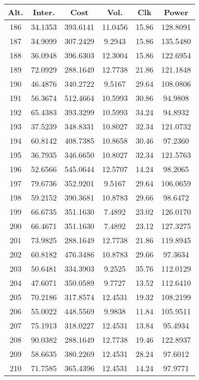 \begin{center}
\begin{footnotesize}
\begin{tabular}{|c|ccccc|}
\hline
Alt. & Inter. & Cost & Vol. & Clk & Power\\
\hline
186 & 34.1353 & 393.6141 & 11.0456 & 15.86 & 128.8091 \\
187 & 34.9099 & 307.2429 & 9.2943 & 15.86 & 135.5480 \\
188 & 36.0948 & 396.6303 & 12.3004 & 15.86 & 122.6954 \\
189 & 72.0929 & 288.1649 & 12.7738 & 21.86 & 121.1848 \\
190 & 46.4876 & 340.2722 & 9.5167 & 29.64 & 108.0806 \\
191 & 56.3674 & 512.4664 & 10.5993 & 30.86 & 94.9808 \\
192 & 65.4383 & 393.3299 & 10.5993 & 34.24 & 94.8932 \\
193 & 37.5239 & 348.8331 & 10.8027 & 32.34 & 121.0732 \\
194 & 60.8142 & 408.7385 & 10.8658 & 30.46 & 97.2360 \\
195 & 36.7935 & 346.6650 & 10.8027 & 32.34 & 121.5763 \\
196 & 52.6566 & 545.0644 & 12.5707 & 14.24 & 98.2065 \\
197 & 79.6736 & 352.9201 & 9.5167 & 29.64 & 106.0659 \\
198 & 59.2152 & 390.3681 & 10.8783 & 29.66 & 98.6472 \\
199 & 66.6735 & 351.1630 & 7.4892 & 23.02 & 126.0170 \\
200 & 66.4671 & 351.1630 & 7.4892 & 23.12 & 127.3275 \\
201 & 73.9825 & 288.1649 & 12.7738 & 21.86 & 119.8945 \\
202 & 60.8182 & 476.3486 & 10.8783 & 29.66 & 97.3634 \\
203 & 50.6481 & 334.3903 & 9.2525 & 35.76 & 112.0129 \\
204 & 47.6071 & 350.0589 & 9.7727 & 13.52 & 112.6410 \\
205 & 70.2186 & 317.8574 & 12.4531 & 19.32 & 108.2199 \\
206 & 55.0022 & 448.5569 & 9.9838 & 11.84 & 105.9511 \\
207 & 75.1913 & 318.0227 & 12.4531 & 13.84 & 95.4934 \\
208 & 90.0382 & 288.1649 & 12.7738 & 19.46 & 122.8937 \\
209 & 58.6635 & 380.2269 & 12.4531 & 28.24 & 97.6012 \\
210 & 71.7585 & 365.4396 & 12.4531 & 14.24 & 97.9771 \\

\end{tabular}
\end{footnotesize}
\end{center}

